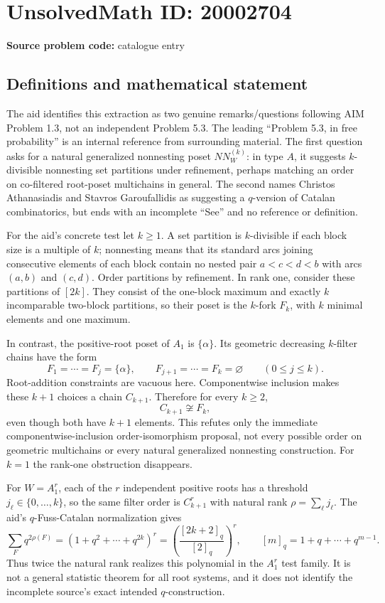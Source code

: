 \documentclass[11pt]{article}
\begin{document}
\section*{UnsolvedMath ID: 20002704}
\textbf{Source problem code:} catalogue entry
\subsection{Definitions and mathematical statement}
The aid identifies this extraction as two genuine remarks/questions following AIM Problem 1.3, not an independent Problem 5.3. The leading ``Problem 5.3, in free probability'' is an internal reference from surrounding material. The first question asks for a natural generalized nonnesting poset $NN_W^{(k)}$: in type $A$, it suggests $k$-divisible nonnesting set partitions under refinement, perhaps matching an order on co-filtered root-poset multichains in general. The second names Christos Athanasiadis and Stavros Garoufallidis as suggesting a $q$-version of Catalan combinatorics, but ends with an incomplete ``See'' and no reference or definition.

For the aid's concrete test let $k\geq1$. A set partition is $k$-divisible if each block size is a multiple of $k$; nonnesting means that its standard arcs joining consecutive elements of each block contain no nested pair $a<c<d<b$ with arcs $(a,b)$ and $(c,d)$. Order partitions by refinement. In rank one, consider these partitions of $[2k]$. They consist of the one-block maximum and exactly $k$ incomparable two-block partitions, so their poset is the $k$-fork $F_k$, with $k$ minimal elements and one maximum.

In contrast, the positive-root poset of $A_1$ is $\{\alpha\}$. Its geometric decreasing $k$-filter chains have the form
\[
F_1=\cdots=F_j=\{\alpha\},\qquad
F_{j+1}=\cdots=F_k=\varnothing\qquad(0\leq j\leq k).
\]
Root-addition constraints are vacuous here. Componentwise inclusion makes these $k+1$ choices a chain $C_{k+1}$. Therefore for every $k\geq2$,
\[
C_{k+1}\not\cong F_k,
\]
even though both have $k+1$ elements. This refutes only the immediate componentwise-inclusion order-isomorphism proposal, not every possible order on geometric multichains or every natural generalized nonnesting construction. For $k=1$ the rank-one obstruction disappears.

For $W=A_1^r$, each of the $r$ independent positive roots has a threshold $j_\ell\in\{0,\ldots,k\}$, so the same filter order is $C_{k+1}^r$ with natural rank $\rho=\sum_\ell j_\ell$. The aid's $q$-Fuss-Catalan normalization gives
\[
\sum_{F}q^{2\rho(F)}=(1+q^2+\cdots+q^{2k})^r
=\left(\frac{[2k+2]_q}{[2]_q}\right)^r,
\qquad [m]_q=1+q+\cdots+q^{m-1}.
\]
Thus twice the natural rank realizes this polynomial in the $A_1^r$ test family. It is not a general statistic theorem for all root systems, and it does not identify the incomplete source's exact intended $q$-construction.
\end{document}
